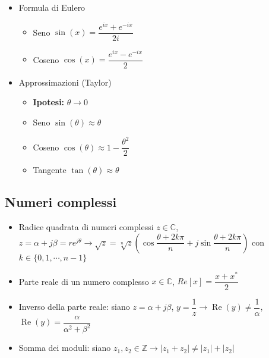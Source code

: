 \documentclass{article}
\begin{document}
\begin{itemize}
\begin{itemize}
	\end{itemize}
	\item Formula di Eulero
	\begin{itemize}
		\item Seno \(\sin(x) = \dfrac{e^{ix} + e^{-ix}}{2i} \)
		\item Coseno \(\cos(x) = \dfrac{e^{ix} - e^{-ix}}{2} \)
	\end{itemize}
	\item Approssimazioni (Taylor)
	\begin{itemize}
		\item \textbf{Ipotesi:} \( \theta \rightarrow 0 \)
		\item Seno \( \sin(\theta) \approx \theta \)
		\item Coseno \( \cos(\theta) \approx 1 - \dfrac{\theta^2}{2} \)
		\item Tangente \( \tan(\theta) \approx \theta\)
	\end{itemize}
\end{itemize}

\subsection{Numeri complessi}
\begin{itemize}
	\item Radice quadrata di numeri complessi \(z \in \mathbb{C}\), \\ \( z = \alpha + j \beta = r e^{j \theta} \rightarrow \sqrt{z} = \sqrt[n]{z} \left( \cos{\dfrac{\theta + 2k\pi}{n}} + j \sin{\dfrac{\theta + 2 k \pi}{n}} \right) \) \newline con \(k \in \{0, 1, \cdots, n-1 \} \)
	\item Parte reale di un numero complesso \(x \in \mathbb{C}\), \(Re[x] = \dfrac{x + x^{*}}{2} \)
	\item Inverso della parte reale: siano \(z = \alpha + j \beta \), \(y = \dfrac{1}{z} \rightarrow \operatorname{Re}(y) \neq \dfrac{1}{\alpha}\), \(\operatorname{Re}(y)  = \dfrac{\alpha}{\alpha^2 + \beta^2}\)
	\item Somma dei moduli: siano \(z_1, z_2 \in \mathbb{Z} \rightarrow |z_1 + z_2| \neq |z_1| + |z_2| \)
\end{itemize}
\end{document}
